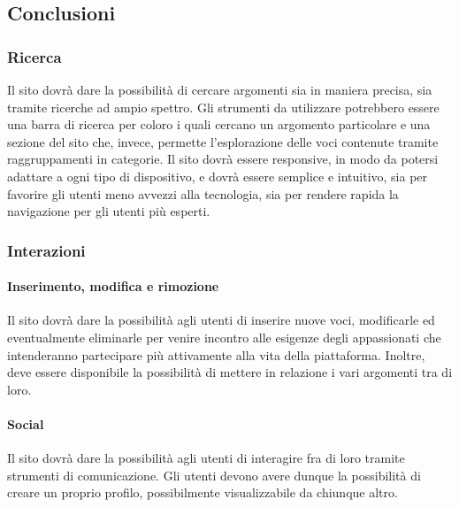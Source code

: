 \subsection{Conclusioni}

\subsubsection{Ricerca}
Il sito dovrà dare la possibilità di cercare argomenti sia in maniera precisa, sia tramite ricerche ad ampio spettro. Gli strumenti da utilizzare potrebbero essere una barra di ricerca per coloro i quali cercano un argomento particolare e una sezione del sito che, invece, permette l'esplorazione delle voci contenute tramite raggruppamenti in categorie. Il sito dovrà essere responsive, in modo da potersi adattare a ogni tipo di dispositivo, e dovrà essere semplice e intuitivo, sia per favorire gli utenti meno avvezzi alla tecnologia, sia per rendere rapida la navigazione per gli utenti più esperti.
\pagebreak
\subsubsection{Interazioni}
\paragraph{Inserimento, modifica e rimozione}
Il sito dovrà dare la possibilità agli utenti di inserire nuove voci, modificarle ed eventualmente eliminarle per venire incontro alle esigenze degli appassionati che intenderanno partecipare più attivamente alla vita della piattaforma. Inoltre, deve essere disponibile la possibilità di mettere in relazione i vari argomenti tra di loro.

\paragraph{Social}
Il sito dovrà dare la possibilità agli utenti di interagire fra di loro tramite strumenti di comunicazione. Gli utenti devono avere dunque la possibilità di creare un proprio profilo, possibilmente visualizzabile da chiunque altro.